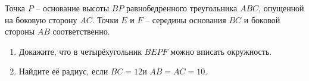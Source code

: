 \begin{ex}
	\begin{condition}
		Точка \( P \) – основание высоты \( BP  \) равнобедренного треугольника \( ABC \), опущенной на боковую сторону \( AC \). Точки \( E  \) и \( F \) – середины основания \( BC  \) и боковой стороны \( AB  \) соответственно.
		\begin{enumerate}
			\item Докажите, что в четырёхугольник \( BEPF  \) можно вписать окружность.
			\item Найдите её радиус, если \( BC=12  \)и \( AB=AC=10 \).
		\end{enumerate}
	\end{condition}
\end{ex}